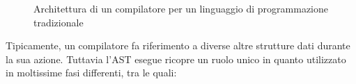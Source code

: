 \begin{figure}
\caption{Architettura di un compilatore per un linguaggio di programmazione
tradizionale}
\label{fig:compiler-architecture}
\end{figure}

Tipicamente, un compilatore fa riferimento a diverse altre strutture dati
durante la sua azione. Tuttavia l’AST esegue ricopre un ruolo unico in quanto
utilizzato in moltissime fasi differenti, tra le quali:

